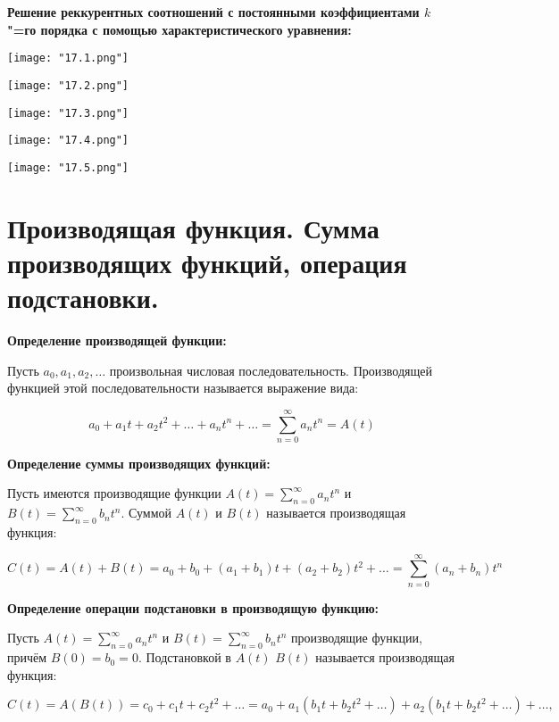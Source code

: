 \textbf{Решение реккурентных соотношений с постоянными коэффициентами $k$"=го порядка
с помощью характеристического уравнения:}
    \smallskip
    
    \begin{center}
        \texttt{[image: "17.1.png"]}
        \bigskip

        \texttt{[image: "17.2.png"]}
        \bigskip

        \texttt{[image: "17.3.png"]}
        \bigskip

        \texttt{[image: "17.4.png"]}
        \bigskip

        \texttt{[image: "17.5.png"]}
        \bigskip
    \end{center}

\section{Производящая функция. Сумма производящих функций, операция подстановки.}    

\textbf{Определение производящей функции:}
    \smallskip

    Пусть $a_0, a_1, a_2, \dots$ произвольная числовая последовательность. Производящей
    функцией этой последовательности называется выражение вида:

    \[
        a_0 + a_1 t + a_2 t^2 + \dots + a_n t^n + \dots = \sum\limits^{\infty}_{n = 0}
        a_n t^n = A(t)  
    \]
    \bigskip

\textbf{Определение суммы производящих функций:}
    \smallskip

    Пусть имеются производящие функции $A(t) = \sum\limits^{\infty}_{n = 0} a_n t^n$
    и $B(t) = \sum\limits^{\infty}_{n = 0} b_n t^n$. Суммой $A(t)$ и $B(t)$
    называется производящая функция:

    \[
        C(t) = A(t) + B(t) = a_0 + b_0 + (a_1 + b_1)t + (a_2 + b_2)t^2 + \dots
        = \sum\limits^{\infty}_{n = 0} (a_n + b_n) t^n  
    \]
    \bigskip

\textbf{Определение операции подстановки в производящую функцию:}
    \smallskip
    
    Пусть $A(t) = \sum\limits^{\infty}_{n = 0} a_n t^n$ и $B(t) = \sum\limits^{\infty}_{n = 0}
    b_n t^n$ производящие функции, причём $B(0) = b_0 = 0$. Подстановкой в $A(t)$
    $B(t)$ называется производящая функция:

    \[
        C(t) = A(B(t)) = c_0 + c_1 t + c_2 t^2 + \dots =
        a_0 + a_1 (b_1 t + b_2 t^2 + \dots) + a_2 (b_1 t + b_2 t^2 + \dots) +
        \dots,
    \]
    
